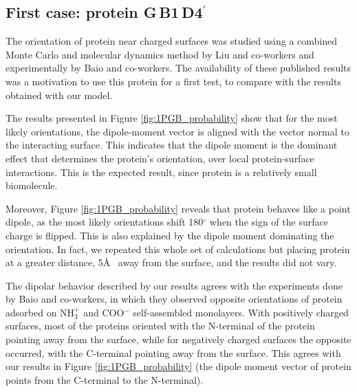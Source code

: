 
\subsection{First case: protein G\,B1\,D4$^\prime$} \label{sec:disc_1PGB}

The orientation of protein \gb near charged surfaces was studied using a combined Monte Carlo and molecular dynamics method by Liu and co-workers\cite{LiuLiaoZhou2013} and experimentally by Baio and co-workers.\cite{BaioWeidnerBaughGambleStaytonCastner2012} The availability of these published results was a motivation to use this protein for a first test, to compare with the results obtained with our model. 

The results presented in Figure \ref{fig:1PGB_probability} show that for the most likely orientations, the dipole-moment vector is aligned with the vector normal to the interacting surface. This indicates that the dipole moment is the dominant effect that determines the protein's orientation, over local protein-surface  interactions. This is the expected result, since protein \gb is a relatively small biomolecule. 

Moreover, Figure \ref{fig:1PGB_probability} reveals that protein \gb behaves like a point dipole, as the most likely orientations shift 180$^\circ$ when the sign of the surface charge is flipped. This is also explained by the dipole moment dominating the orientation.
In fact, we repeated this whole set of calculations but placing protein \gb at a greater distance, 5\AA~ away from the surface, and the results did not vary.

The dipolar behavior described by our results agrees with the experiments done by Baio and co-workers, \cite{BaioWeidnerBaughGambleStaytonCastner2012} in which they observed opposite orientations of protein \gb adsorbed on NH$_3^+$ and COO$^-$ self-assembled monolayers. With positively charged surfaces, most of the proteins oriented with the N-terminal of the protein pointing away from the surface, while for negatively charged surfaces the opposite occurred, with the C-terminal pointing away from the surface. This agrees with our results in Figure \ref{fig:1PGB_probability} (the dipole moment vector of protein \gb points from the C-terminal to the N-terminal).

